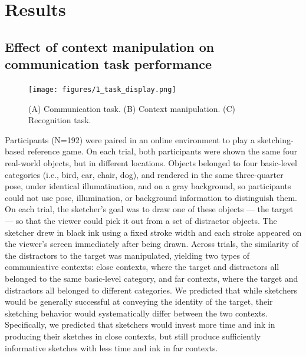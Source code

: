 \documentclass[9pt,twocolumn,twoside]{pnas-new}
\begin{document}
\section*{Results}

\subsection*{Effect of context manipulation on communication task performance}



\begin{figure}[htbp]
\centering
\texttt{[image: figures/1\_task\_display.png]}
\caption{(A) Communication task. (B) Context manipulation. (C) Recognition task.}
\label{task_display}
\end{figure}

Participants (N=192) were paired in an online environment to play a sketching-based reference game. On each trial, both participants were shown the same four real-world objects, but in different locations. Objects belonged to four basic-level categories (i.e., bird, car, chair, dog), and rendered in the same three-quarter pose, under identical illumatination, and on a gray background, so participants could not use pose, illumination, or background information to distinguish them. 
On each trial, the sketcher's goal was to draw one of these objects --- the target --- so that the viewer could pick it out from a set of distractor objects. 
The sketcher drew in black ink using a fixed stroke width and each stroke appeared on the viewer's screen immediately after being drawn. 
Across trials, the similarity of the distractors to the target was manipulated, yielding two types of communicative contexts: close contexts, where the target and distractors all belonged to the same basic-level category, and far contexts, where the target and distractors all belonged to different categories. 
We predicted that while sketchers would be generally successful at conveying the identity of the target, their sketching behavior would systematically differ between the two contexts. 
Specifically, we predicted that sketchers would invest more time and ink in producing their sketches in close contexts, but still produce sufficiently informative sketches with less time and ink in far contexts. 
\end{document}
